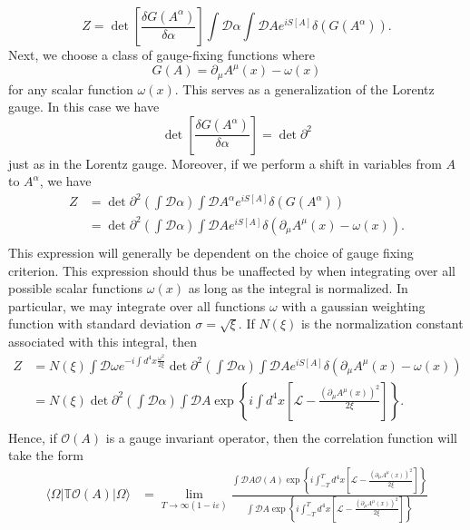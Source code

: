\documentclass[twoside,utf8]{article}
\newcommand{\ket}[1] { |#1\rangle }
\newcommand{\bra}[1] { \langle #1 | }
\begin{document}
\[
Z = \det \left[\frac{\delta G(A^\alpha)}{\delta \alpha}\right] \int \mathcal{D}\alpha \int \mathcal{D}A e^{iS[A]} \delta\left(G(A^\alpha)\right).
\]
Next, we choose a class of gauge-fixing functions where
\[
G(A) = \partial_\mu A^\mu(x)-\omega(x)
\]
for any scalar function $\omega(x)$. This serves as a generalization of the Lorentz gauge. In this case we have
\[
\det \left[\frac{\delta G(A^\alpha)}{\delta \alpha}\right] = \det \partial^2
\]
just as in the Lorentz gauge. Moreover, if we perform a shift in variables from $A$ to $A^\alpha$, we have
\begin{equation*}
\begin{align}
Z
&=
\det \partial^2 \left(\int \mathcal{D}\alpha \right)  \int \mathcal{D}A^\alpha e^{iS[A]} \delta\left(G(A^\alpha)\right) \\
&=
\det \partial^2 \left(\int \mathcal{D}\alpha \right)  \int \mathcal{D}A e^{iS[A]} \delta\left(\partial_\mu A^\mu(x)-\omega(x)\right). \\
\end{align}
\end{equation*}
This expression will generally be dependent on the choice of gauge fixing criterion. This expression should thus be unaffected by when integrating over all possible scalar functions $\omega(x)$ as long as the integral is normalized. In particular, we may integrate over all functions $\omega$ with a gaussian weighting function with standard deviation $\sigma=\sqrt{\xi}$. If $N(\xi)$ is the normalization constant associated with this integral, then
\begin{equation*}
\begin{align}
Z
&=
N(\xi)\int \mathcal{D}\omega e^{-i\int d^4x\frac{\omega^2}{2\xi}} \det \partial^2 \left(\int \mathcal{D}\alpha \right)  \int \mathcal{D}A e^{iS[A]} \delta\left(\partial_\mu A^\mu(x)-\omega(x)\right) \\
&=
N(\xi) \det \partial^2 \left(\int \mathcal{D}\alpha \right)  \int \mathcal{D}A \exp\left\{i\int d^4x \left[\mathcal{L}-\frac{(\partial_\mu A^\mu(x))^2}{2\xi} \right]\right\}. \\
\end{align}
\end{equation*}
Hence, if $\mathcal{O}(A)$ is a gauge invariant operator, then the correlation function will take the form
\begin{equation*}
\begin{align}
\bra{\Omega}\mathbb{T}\mathcal{O}(A)\ket{\Omega}
&=
\lim_{T\rightarrow \infty(1-i\varepsilon)}
\frac{
\int \mathcal{D}A \mathcal{O}(A)\exp\left\{i\int_{-T}^T d^4x \left[\mathcal{L}-\frac{(\partial_\mu A^\mu(x))^2}{2\xi} \right]\right\}
}{
\int \mathcal{D}A \exp\left\{i\int_{-T}^T d^4x \left[\mathcal{L}-\frac{(\partial_\mu A^\mu(x))^2}{2\xi} \right]\right\}
}
\end{align}
\end{equation*}
\end{document}
